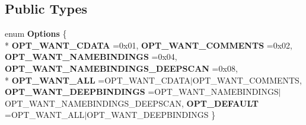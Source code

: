 \subsection*{Public Types}
\begin{DoxyCompactItemize}
\item 
enum {\bfseries Options} \{ \\*
{\bfseries O\+P\+T\+\_\+\+W\+A\+N\+T\+\_\+\+C\+D\+A\+TA} =0x01, 
{\bfseries O\+P\+T\+\_\+\+W\+A\+N\+T\+\_\+\+C\+O\+M\+M\+E\+N\+TS} =0x02, 
{\bfseries O\+P\+T\+\_\+\+W\+A\+N\+T\+\_\+\+N\+A\+M\+E\+B\+I\+N\+D\+I\+N\+GS} =0x04, 
{\bfseries O\+P\+T\+\_\+\+W\+A\+N\+T\+\_\+\+N\+A\+M\+E\+B\+I\+N\+D\+I\+N\+G\+S\+\_\+\+D\+E\+E\+P\+S\+C\+AN} =0x08, 
\\*
{\bfseries O\+P\+T\+\_\+\+W\+A\+N\+T\+\_\+\+A\+LL} =O\+P\+T\+\_\+\+W\+A\+N\+T\+\_\+\+C\+D\+A\+T\+A$\vert$\+O\+P\+T\+\_\+\+W\+A\+N\+T\+\_\+\+C\+O\+M\+M\+E\+N\+TS, 
{\bfseries O\+P\+T\+\_\+\+W\+A\+N\+T\+\_\+\+D\+E\+E\+P\+B\+I\+N\+D\+I\+N\+GS} =O\+P\+T\+\_\+\+W\+A\+N\+T\+\_\+\+N\+A\+M\+E\+B\+I\+N\+D\+I\+N\+G\+S$\vert$\+O\+P\+T\+\_\+\+W\+A\+N\+T\+\_\+\+N\+A\+M\+E\+B\+I\+N\+D\+I\+N\+G\+S\+\_\+\+D\+E\+E\+P\+S\+C\+AN, 
{\bfseries O\+P\+T\+\_\+\+D\+E\+F\+A\+U\+LT} =O\+P\+T\+\_\+\+W\+A\+N\+T\+\_\+\+A\+L\+L$\vert$\+O\+P\+T\+\_\+\+W\+A\+N\+T\+\_\+\+D\+E\+E\+P\+B\+I\+N\+D\+I\+N\+GS
 \}\hypertarget{classXMLDOM_1_1XMLSerializer_a46e4320d804eee5541413d625dc2a901}{}\label{classXMLDOM_1_1XMLSerializer_a46e4320d804eee5541413d625dc2a901}

\end{DoxyCompactItemize}
